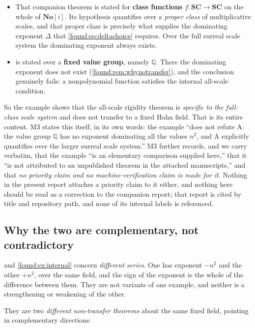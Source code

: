 \documentclass[11pt,letterpaper]{article}
\numberwithin{equation}{section}
\theoremstyle{definition}
\theoremstyle{remark}
\newcommand{\No}{\mathbf{No}}
\newcommand{\SC}{\mathbf{SC}}
\newcommand{\Q}{\mathbb Q}
\begin{document}
\begin{itemize}
\item That companion theorem is stated for \textbf{class functions}
$f:\SC\to\SC$ on the whole of $\No[i]$. Its hypothesis quantifies over a
\emph{proper class} of multiplicative scales, and that proper class is precisely
what supplies the dominating exponent $\Delta$ that
\eqref{found:eq:deltachoice} requires. Over the full surreal scale system the
dominating exponent always exists.
\item {} is stated over a \textbf{fixed value group},
namely $\Q$. There the dominating exponent does not exist
(\cref{found:rem:whynotransfer}), and the conclusion genuinely fails: a
nonpolynomial function satisfies the internal all-scale condition.
\end{itemize}

So the example shows that the all-scale rigidity theorem is \emph{specific to
the full-class scale system} and does not transfer to a fixed Hahn field. That
is its entire content. M3 states this itself, in its own words: the example
``does not refute A: the value group $\Q$ has no exponent dominating all the
values $n^2$, and A explicitly quantifies over the larger surreal scale
system.'' M3 further records, and we carry verbatim, that the example ``is an
elementary comparison supplied here,'' that it ``is not attributed to an
unpublished theorem in the attached manuscripts,'' and that \emph{no priority
claim and no machine-verification claim is made for it}. Nothing in the present
report attaches a priority claim to it either, and nothing here should be read
as a correction to the companion report; that report is cited by title and
repository path, and none of its internal labels is referenced.

\subsection{Why the two are complementary, not contradictory}
\label{found:sub:complementary}
 and \cref{found:ex:internal} concern \emph{different
series}. One has exponent $-n^2$ and the other $+n^2$, over the same field, and
the sign of the exponent is the whole of the difference between them. They are
not variants of one example, and neither is a strengthening or weakening of the
other.

They are two \emph{different non-transfer theorems} about the same fixed field,
pointing in complementary directions:
\end{document}
